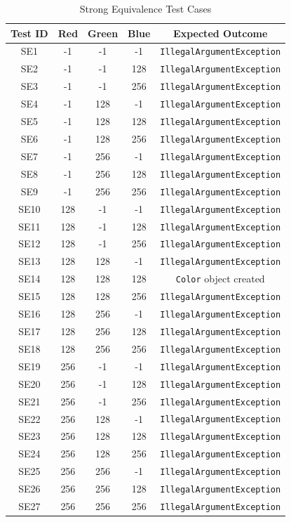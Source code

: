 \documentclass[11pt, a4paper]{article}
\begin{document}
\begin{table}[H]
\centering
\caption{Strong Equivalence Test Cases}
\label{tab:color_strong_equivalence}
\begin{tabular}{ccccc}
\toprule
\textbf{Test ID} & \textbf{Red} & \textbf{Green} & \textbf{Blue} & \textbf{Expected Outcome} \\
\midrule
SE1  & -1  & -1  & -1  & \texttt{IllegalArgumentException} \\
SE2  & -1  & -1  & 128 & \texttt{IllegalArgumentException} \\
SE3  & -1  & -1  & 256 & \texttt{IllegalArgumentException} \\
SE4  & -1  & 128 & -1  & \texttt{IllegalArgumentException} \\
SE5  & -1  & 128 & 128 & \texttt{IllegalArgumentException} \\
SE6  & -1  & 128 & 256 & \texttt{IllegalArgumentException} \\
SE7  & -1  & 256 & -1  & \texttt{IllegalArgumentException} \\
SE8  & -1  & 256 & 128 & \texttt{IllegalArgumentException} \\
SE9  & -1  & 256 & 256 & \texttt{IllegalArgumentException} \\
SE10 & 128 & -1  & -1  & \texttt{IllegalArgumentException} \\
SE11 & 128 & -1  & 128 & \texttt{IllegalArgumentException} \\
SE12 & 128 & -1  & 256 & \texttt{IllegalArgumentException} \\
SE13 & 128 & 128 & -1  & \texttt{IllegalArgumentException} \\
SE14 & 128 & 128 & 128 & \texttt{Color} object created \\
SE15 & 128 & 128 & 256 & \texttt{IllegalArgumentException} \\
SE16 & 128 & 256 & -1  & \texttt{IllegalArgumentException} \\
SE17 & 128 & 256 & 128 & \texttt{IllegalArgumentException} \\
SE18 & 128 & 256 & 256 & \texttt{IllegalArgumentException} \\
SE19 & 256 & -1  & -1  & \texttt{IllegalArgumentException} \\
SE20 & 256 & -1  & 128 & \texttt{IllegalArgumentException} \\
SE21 & 256 & -1  & 256 & \texttt{IllegalArgumentException} \\
SE22 & 256 & 128 & -1  & \texttt{IllegalArgumentException} \\
SE23 & 256 & 128 & 128 & \texttt{IllegalArgumentException} \\
SE24 & 256 & 128 & 256 & \texttt{IllegalArgumentException} \\
SE25 & 256 & 256 & -1  & \texttt{IllegalArgumentException} \\
SE26 & 256 & 256 & 128 & \texttt{IllegalArgumentException} \\
SE27 & 256 & 256 & 256 & \texttt{IllegalArgumentException} \\
\bottomrule
\end{tabular}
\end{table}
\end{document}
